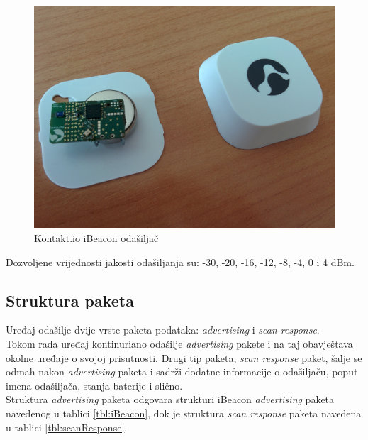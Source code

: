 \begin{figure}[H]
    \centering
    \includegraphics[scale=0.1]{pictures/IMG_20140505_095855}
    \caption{Kontakt.io iBeacon odašiljač}
\end{figure}

Dozvoljene vrijednosti jakosti odašiljanja su: -30, -20, -16, -12, -8, -4, 0 i 4 dBm.


\subsection{Struktura paketa}

Uređaj odašilje dvije vrste paketa podataka: \textit{advertising} i \textit{scan response}.
\\
Tokom rada uređaj kontinuriano odašilje \textit{advertising} pakete i na taj obavještava okolne uređaje o svojoj prisutnosti. 
Drugi tip paketa, \textit{scan response} paket, šalje se odmah nakon \textit{advertising} paketa i sadrži dodatne informacije o odašiljaču, poput imena odašiljača, stanja baterije i slično.
\\

Struktura \textit{advertising} paketa odgovara strukturi iBeacon \textit{advertising} paketa navedenog u tablici \ref{tbl:iBeacon}, dok je struktura \textit{scan response} paketa navedena u tablici \ref{tbl:scanResponse}.
\\

